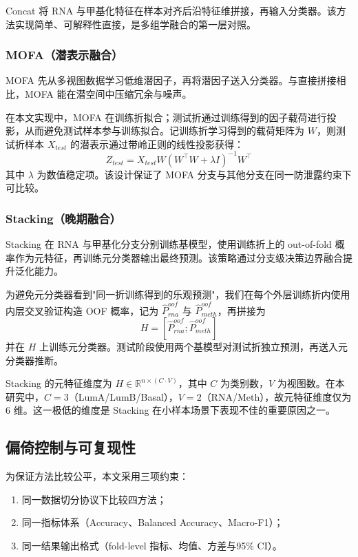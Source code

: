 Concat 将 RNA 与甲基化特征在样本对齐后沿特征维拼接，再输入分类器。该方法实现简单、可解释性直接，是多组学融合的第一层对照。

\subsubsection{MOFA（潜表示融合）}

MOFA 先从多视图数据学习低维潜因子，再将潜因子送入分类器。与直接拼接相比，MOFA 能在潜空间中压缩冗余与噪声。

在本文实现中，MOFA 在训练折拟合；测试折通过训练得到的因子载荷进行投影，从而避免测试样本参与训练拟合。记训练折学习得到的载荷矩阵为 $W$，则测试折样本 $X_{test}$ 的潜表示通过带岭正则的线性投影获得：
$$
Z_{test}=X_{test}W(W^\top W+\lambda I)^{-1}W^\top
$$
其中 $\lambda$ 为数值稳定项。该设计保证了 MOFA 分支与其他分支在同一防泄露约束下可比较。

\subsubsection{Stacking（晚期融合）}

Stacking 在 RNA 与甲基化分支分别训练基模型，使用训练折上的 out-of-fold 概率作为元特征，再训练元分类器输出最终预测。该策略通过分支级决策边界融合提升泛化能力。

为避免元分类器看到"同一折训练得到的乐观预测"，我们在每个外层训练折内使用内层交叉验证构造 OOF 概率，记为 $\hat{P}_{rna}^{oof}$ 与 $\hat{P}_{meth}^{oof}$，再拼接为
\[
H=[\hat{P}_{rna}^{oof};\hat{P}_{meth}^{oof}]
\]
并在 $H$ 上训练元分类器。测试阶段使用两个基模型对测试折独立预测，再送入元分类器推断。

Stacking 的元特征维度为 $H \in \mathbb{R}^{n \times (C \cdot V)}$，其中 $C$ 为类别数，$V$ 为视图数。在本研究中，$C=3$（LumA/LumB/Basal），$V=2$（RNA/Meth），故元特征维度仅为 6 维。这一极低的维度是 Stacking 在小样本场景下表现不佳的重要原因之一。

\subsection{偏倚控制与可复现性}

为保证方法比较公平，本文采用三项约束：

\begin{enumerate}
    \item 同一数据切分协议下比较四方法；
    \item 同一指标体系（Accuracy、Balanced Accuracy、Macro-F1）；
    \item 同一结果输出格式（fold-level 指标、均值、方差与95\% CI）。
\end{enumerate}

